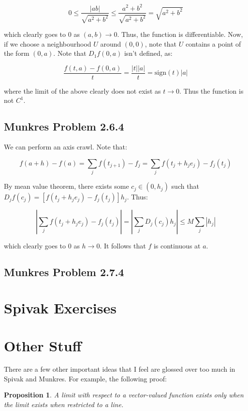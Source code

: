\documentclass[10pt, oneside]{amsart}
\newtheorem{prop}{Proposition}
\begin{document}
    $$0 \leq \frac{|ab|}{\sqrt{a^2 + b^2}} \leq \frac{a^2 + b^2}{\sqrt{a^2 + b^2}} = \sqrt{a^2 + b^2}$$

    which clearly goes to $0$ as $(a, b) \rightarrow 0$. Thus, the function is differentiable.
    Now, if we choose a neighbourhood $U$ around $(0, 0)$, note that $U$ contains a point of the form $(0, a)$. Note that $D_1 f(0, a)$ isn't defined, as:

    $$\frac{f(t, a) - f(0, a)}{t} = \frac{|t||a|}{t} = \text{sign}(t) |a|$$

    where the limit of the above clearly does not exist as $t \rightarrow 0$. Thus the function is not $C^{1}$.

    \subsection{Munkres Problem 2.6.4}

    We can perform an axis crawl. Note that:

    $$f(a + h) - f(a) = \displaystyle\sum_{j} f(t_{j + 1}) - f_{j} = \displaystyle\sum_{j} f(t_j + h_j e_j) - f_j(t_j)$$

    By mean value theorem, there exists some $c_j \in (0, h_j)$ such that $D_j f(c_j) = [f(t_j + h_j e_j) - f_j(t_j)] h_j$. Thus:

    $$\left| \displaystyle\sum_{j} f(t_j + h_j e_j) - f_j(t_j) \right| = \left| \displaystyle\sum_{j} D_j(c_j) h_j \right| \leq M \displaystyle\sum_{j} |h_j|$$

    which clearly goes to $0$ as $h \rightarrow 0$. It follows that $f$ is continuous at $a$.

    \subsection{Munkres Problem 2.7.4}

      \section{Spivak Exercises}

      \section{Other Stuff}

      There are a few other important ideas that I feel are glossed over too much in Spivak and Munkres. For example, the following proof:

      \begin{prop}
        A limit with respect to a vector-valued function exists only when the limit exists when restricted to a line.
        \end{prop}
\end{document}
